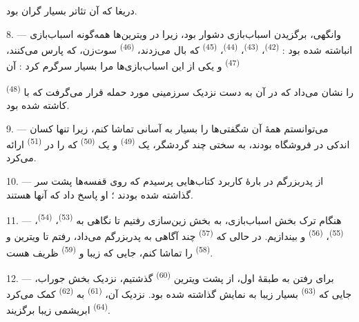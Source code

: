 دریغا که آن تئاتر بسیار گران بود.

8. --- وانگهی، برگزیدن اسباب‌بازی دشوار بود، زیرا در ویترین‌ها
همه‌گونه اسباب‌بازی انباشته شده بود : 
\textsuperscript{(42)}،  \textsuperscript{(43)}،
 \textsuperscript{(44)}، 
\textsuperscript{(45)} که بال می‌زدند، 
\textsuperscript{(46)} سوت‌زن،  که پارس می‌کنند،
 \textsuperscript{(47)} و 
یکی از این اسباب‌بازی‌ها مرا بسیار سرگرم کرد : آن


 \textsuperscript{(48)} را نشان می‌داد که در آن
 به دست  نزدیک سرزمینی مورد حمله
قرار می‌گرفت که با  کاشته شده بود.

9. --- می‌توانستم همهٔ آن شگفتی‌ها را بسیار به آسانی تماشا کنم، زیرا
تنها کسان اندکی در فروشگاه بودند، به سختی چند گردشگر، یک
 \textsuperscript{(49)} و یک 
\textsuperscript{(50)} که  را در 
\textsuperscript{(51)} ارائه می‌کرد.

10. --- از پدربزرگم در بارهٔ کاربرد کتاب‌هایی پرسیدم که روی قفسه‌ها
پشت سر  گذاشته شده بودند ؛ او پاسخ داد که آنها
 هستند.

\VUsaut{3.6mm}
\VUsaut{2.8mm}

11. --- هنگام ترک بخش اسباب‌بازی، به بخش زین‌سازی رفتیم تا نگاهی به
 \textsuperscript{(53)}، 
\textsuperscript{(54)}،  \textsuperscript{(55)}،
 \textsuperscript{(56)} و 
بیندازیم. در حالی که  \textsuperscript{(57)} چند
آگاهی به پدربزرگم می‌داد، رفتم تا ویترین  و
 \textsuperscript{(58)} را تماشا کنم، جایی که
 زیبا و 
\textsuperscript{(59)} ظریف هست.

12. --- برای رفتن به طبقهٔ اول، از پشت ویترین 
\textsuperscript{(60)} گذشتیم، نزدیک بخش جوراب، جایی که 
\textsuperscript{(63)} بسیار زیبا به نمایش گذاشته شده بود. نزدیک آن،
 \textsuperscript{(61)} به 
\textsuperscript{(62)} کمک می‌کرد 
\textsuperscript{(64)} ابریشمی زیبا برگزیند.

